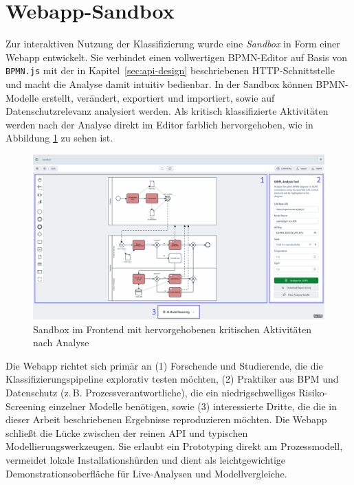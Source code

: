 \section{Webapp-Sandbox}\label{sec:nutzung-uber-webapp}

Zur interaktiven Nutzung der Klassifizierung wurde eine \emph{Sandbox} in Form einer Webapp entwickelt. Sie verbindet einen vollwertigen \ac{BPMN}-Editor auf Basis von \texttt{BPMN.js} \cite{bpmn-js} mit der in Kapitel~\ref{sec:api-design} beschriebenen HTTP-Schnittstelle und macht die Analyse damit intuitiv bedienbar. In der Sandbox können \ac{BPMN}-Modelle erstellt, verändert, exportiert und importiert, sowie auf Datenschutzrelevanz analysiert werden. Als kritisch klassifizierte Aktivitäten werden nach der Analyse direkt im Editor farblich hervorgehoben, wie in Abbildung \ref{fig:sandbox-frontend-analyzed-model} zu sehen ist.

\begin{figure}[h]
    \centering
    \includegraphics[width=\linewidth]{images/sandbox/sandbox-analyzed-model-annotated}
    \caption{Sandbox im Frontend mit hervorgehobenen kritischen Aktivitäten nach Analyse}
    \label{fig:sandbox-frontend-analyzed-model}
\end{figure}

Die Webapp richtet sich primär an (1) Forschende und Studierende, die die Klassifizierungspipeline explorativ testen möchten, (2) Praktiker aus \ac{BPM} und Datenschutz (z.\,B. Prozessverantwortliche), die ein niedrigschwelliges Risiko-Screening einzelner Modelle benötigen, sowie (3) interessierte Dritte, die die in dieser Arbeit beschriebenen Ergebnisse reproduzieren möchten. Die Webapp schließt die Lücke zwischen der reinen API und typischen Modellierungswerkzeugen. Sie erlaubt ein Prototyping direkt am Prozessmodell, vermeidet lokale Installationshürden und dient als leichtgewichtige Demonstrationsoberfläche für Live-Analysen und Modellvergleiche.


